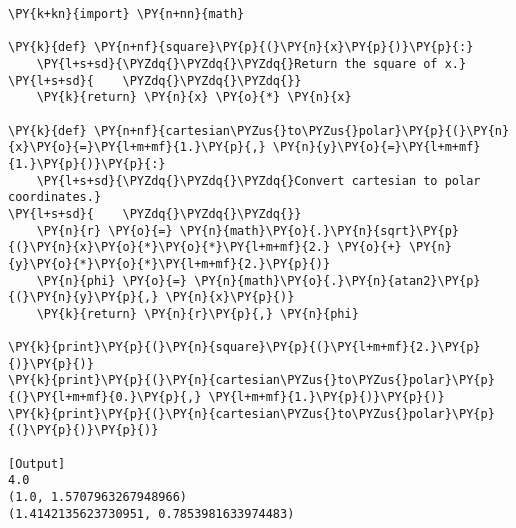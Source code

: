 \begin{Verbatim}[label=\makebox{\url{https://github.com/lucabaldini/cmepda/tree/master/slides/latex/snippets/func1.py}},commandchars=\\\{\}]
\PY{k+kn}{import} \PY{n+nn}{math}

\PY{k}{def} \PY{n+nf}{square}\PY{p}{(}\PY{n}{x}\PY{p}{)}\PY{p}{:}
    \PY{l+s+sd}{\PYZdq{}\PYZdq{}\PYZdq{}Return the square of x.}
\PY{l+s+sd}{    \PYZdq{}\PYZdq{}\PYZdq{}}
    \PY{k}{return} \PY{n}{x} \PY{o}{*} \PY{n}{x}

\PY{k}{def} \PY{n+nf}{cartesian\PYZus{}to\PYZus{}polar}\PY{p}{(}\PY{n}{x}\PY{o}{=}\PY{l+m+mf}{1.}\PY{p}{,} \PY{n}{y}\PY{o}{=}\PY{l+m+mf}{1.}\PY{p}{)}\PY{p}{:}
    \PY{l+s+sd}{\PYZdq{}\PYZdq{}\PYZdq{}Convert cartesian to polar coordinates.}
\PY{l+s+sd}{    \PYZdq{}\PYZdq{}\PYZdq{}}
    \PY{n}{r} \PY{o}{=} \PY{n}{math}\PY{o}{.}\PY{n}{sqrt}\PY{p}{(}\PY{n}{x}\PY{o}{*}\PY{o}{*}\PY{l+m+mf}{2.} \PY{o}{+} \PY{n}{y}\PY{o}{*}\PY{o}{*}\PY{l+m+mf}{2.}\PY{p}{)}
    \PY{n}{phi} \PY{o}{=} \PY{n}{math}\PY{o}{.}\PY{n}{atan2}\PY{p}{(}\PY{n}{y}\PY{p}{,} \PY{n}{x}\PY{p}{)}
    \PY{k}{return} \PY{n}{r}\PY{p}{,} \PY{n}{phi}

\PY{k}{print}\PY{p}{(}\PY{n}{square}\PY{p}{(}\PY{l+m+mf}{2.}\PY{p}{)}\PY{p}{)}
\PY{k}{print}\PY{p}{(}\PY{n}{cartesian\PYZus{}to\PYZus{}polar}\PY{p}{(}\PY{l+m+mf}{0.}\PY{p}{,} \PY{l+m+mf}{1.}\PY{p}{)}\PY{p}{)}
\PY{k}{print}\PY{p}{(}\PY{n}{cartesian\PYZus{}to\PYZus{}polar}\PY{p}{(}\PY{p}{)}\PY{p}{)}

[Output]
4.0
(1.0, 1.5707963267948966)
(1.4142135623730951, 0.7853981633974483)
\end{Verbatim}